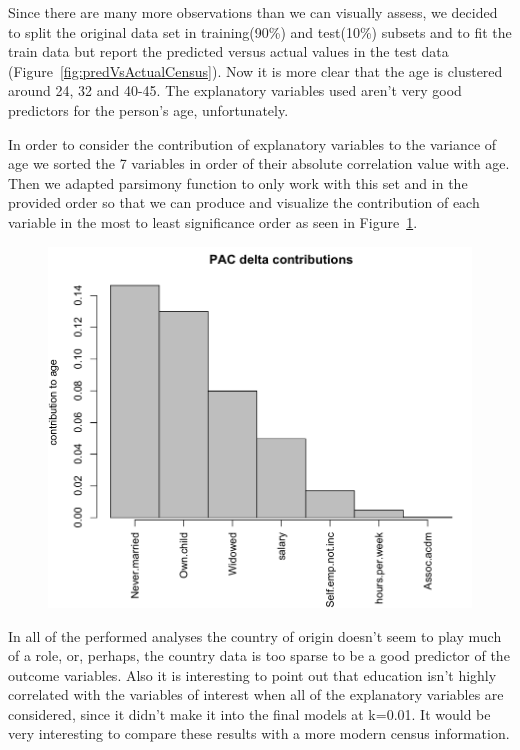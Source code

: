 \documentclass[letter]{article}
\begin{document}
Since there are many more observations than we can visually assess, we decided to split the original data set in training(90\%) and test(10\%) subsets and to fit the train data but report the predicted versus actual values in the test data (Figure~\ref{fig:predVsActualCensus}). Now it is more clear that the age is clustered around 24, 32 and 40-45. The explanatory variables used aren't very good predictors for the person's age, unfortunately.

In order to consider the contribution of explanatory variables to the variance of age we sorted the 7 variables in order of their absolute correlation value with age. Then we adapted parsimony function to only work with this set and in the provided order so that we can produce and visualize the contribution of each variable in the most to least significance order as seen in Figure~\ref{fig:ageContrib}.

\begin{figure}
\includegraphics[scale=0.5]{figures/ageContrib.png}
\caption{}
 \label{fig:ageContrib}
\end{figure}

In all of the performed analyses the country of origin doesn't seem to play much of a role, or, perhaps, the country data is too sparse to be a good predictor of the outcome variables. Also it is interesting to point out that  education isn't highly correlated with the variables of interest when all of the explanatory variables are considered, since it didn't make it into the final models at k=0.01. It would be very interesting to compare these results with a more modern census information.
\end{document}
